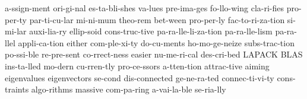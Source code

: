 \hyphenation
{
a-ssign-ment
ori-gi-nal 
es-ta-bli-shes 
va-lues 
pre-ima-ges 
fo-llo-wing
cla-ri-fies
pro-per-ty
par-ti-cu-lar
mi-ni-mum
theo-rem
bet-ween
pro-per-ly
fac-to-ri-za-tion
si-mi-lar
auxi-lia-ry
ellip-soid
cons-truc-tive
pa-ra-lle-li-za-tion
pa-ra-lle-lism
pa-ra-llel
appli-ca-tion
either
com-ple-xi-ty
do-cu-ments
ho-mo-ge-neize
subs-trac-tion
po-ssi-ble
re-pre-sent
co-rrect-ness
easier
nu-me-ri-cal
des-cri-bed
LAPACK
BLAS
ins-ta-lled
mo-dern
cu-rren-tly
pro-ce-ssors
a-tten-tion
attrac-tive
aiming
eigenvalues
eigenvectors
se-cond
dis-connected
ge-ne-ra-ted
connec-ti-vi-ty
cons-traints
algo-rithms
massive
com-pa-ring
a-vai-la-ble
se-ria-lly
}
